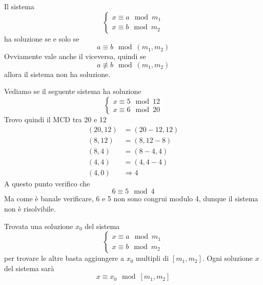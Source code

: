 \begin{theorem}
	Il sistema
	\begin{equation*}
		\begin{cases}
			x \equiv a \mod{m_1} \\
			x \equiv b \mod{m_2}
		\end{cases}
	\end{equation*}
	ha soluzione se e solo se
	\begin{equation*}
		a \equiv b \mod{(m_1, m_2)}
	\end{equation*}
	Ovviamente vale anche il viceversa, quindi se
	\begin{equation*}
		a \not \equiv b \mod{(m_1, m_2)}
	\end{equation*}
	allora il sistema non ha soluzione.
\end{theorem}

\begin{example}
	Vediamo se il seguente sistema ha soluzione
	\begin{equation*}
		\begin{cases}
			x \equiv 5 \mod{12} \\
			x \equiv 6 \mod{20}
		\end{cases}
	\end{equation*}
	Trovo quindi il MCD tra 20 e 12
	\begin{equation*}
		\begin{array}{ll}
			(20, 12) & = (20 - 12, 12) \\
			(8, 12)  & = (8, 12 - 8)   \\
			(8, 4)   & = (8 - 4, 4)    \\
			(4, 4)   & = (4, 4 - 4)    \\
			(4, 0)   & \Rightarrow 4
		\end{array}
	\end{equation*}
	A questo punto verifico che
	\begin{equation*}
		6 \equiv 5 \mod{4}
	\end{equation*}
	Ma come \`e banale verificare, 6 e 5 non sono congrui modulo 4, dunque il sistema non
	\`e risolvibile.
\end{example}

\begin{theorem}
	Trovata una soluzione $x_0$ del sistema
	\begin{equation*}
		\begin{cases}
			x \equiv a \mod{m_1} \\
			x \equiv b \mod{m_2}
		\end{cases}
	\end{equation*}
	per trovare le altre basta aggiungere a $x_0$ multipli di $[m_1, m_2]$.
	Ogni soluzione $x$ del sistema sar\`a
	\begin{equation*}
		x \equiv x_0 \mod{[m_1, m_2]}
	\end{equation*}
\end{theorem}

